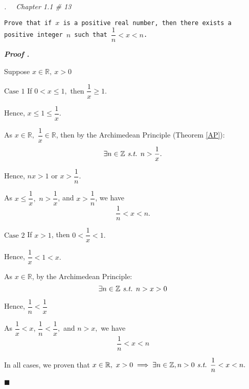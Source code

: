 \documentclass[10pt,letter]{article}
\newcounter{nq}[section]
\newcounter{np}[section]
\newenvironment*{p}{\par\noindent\textbf{\textit{Proof \stepcounter{np}\thenp. }}\par}{\par\hfill $\blacksquare$\par}
\newenvironment*{q}[1]{\noindent\emph{\thesection.\stepcounter{nq}\thenq$\quad $ #1}\par\noindent\texttt}{}
\def\Z{{\mathbb{Z}}}
\def\R{{\mathbb{R}}}
\def\st{\emph{ s.t. }}
\begin{document}
\begin{framed}\begin{q}
	{Chapter 1.1 \# 13}
	{Prove that if $x$ is a positive real number, then there exists a positive integer $n$ such that $\dfrac{1}{n}<x<n$.}
\end{q}\end{framed}
\begin{p}
	Suppose $x\in\R,\ x>0$\par $\boxed{\text{Case }1}$ If $0<x\leq1,$ then $\dfrac{1}{x}\geq1.$\par\hspace{10mm} Hence, $x\leq1\leq\dfrac{1}{x}.$\par\hspace{10mm} As $x\in\R,$ $\dfrac{1}{x}\in\R$, then by the Archimedean Principle (Theorem \ref{AP}): \[\exists n\in\Z\st n>\dfrac{1}{x}.\]\par\hspace{10mm} Hence, $nx>1$ or $x>\dfrac{1}{n}.$\par\hspace{10mm}As $x\leq\dfrac{1}{x},$ $n>\dfrac{1}{x}$, and $x>\dfrac{1}{n}$, we have \[\frac{1}{n}<x<n.\]\par$\boxed{\text{Case }2}$ If $x>1$, then $0<\dfrac{1}{x}<1.$\par\hspace{10mm} Hence, $\dfrac{1}{x}<1<x.$\par\hspace{10mm} As $x\in\R$, by the Archimedean Principle: \[\exists n\in\Z\st n>x>0\]\par\hspace{10mm} Hence, $\dfrac{1}{n}<\dfrac{1}{x}$\par\hspace{10mm} As $\dfrac{1}{x}<x$, $\dfrac{1}{n}<\dfrac{1}{x},$ and $n>x,$ we have \[\dfrac{1}{n}<x<n\]\par In all cases, we proven that $x\in\R,\ x>0\implies\exists n\in\Z, n>0\st\dfrac{1}{n}<x<n.$
\end{p}
\end{document}
